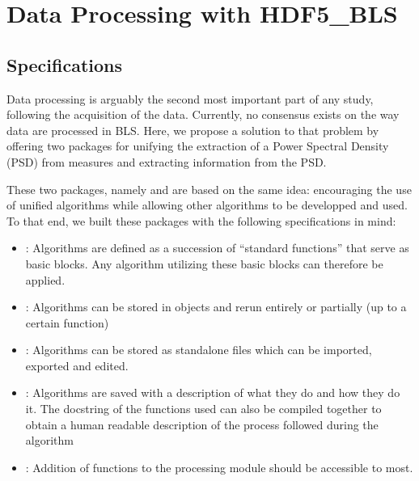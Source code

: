 \documentclass[letterpaper,10pt,english]{sphinxmanual}
\begin{document}
\sphinxstepscope


\chapter{Data Processing with HDF5\_BLS}
\label{\detokenize{source/data_processing:data-processing-with-hdf5-bls}}\label{\detokenize{source/data_processing::doc}}

\section{Specifications}
\label{\detokenize{source/data_processing:specifications}}
\sphinxAtStartPar
Data processing is arguably the second most important part of any study, following the acquisition of the data. Currently, no consensus exists on the way data are processed in BLS. Here, we propose a solution to that problem by offering two packages for unifying the extraction of a Power Spectral Density (PSD) from measures and extracting information from the PSD.

\sphinxAtStartPar
These two packages, namely  and  are based on the same idea: encouraging the use of unified algorithms while allowing other algorithms to be developped and used. To that end, we built these packages with the following specifications in mind:
\begin{itemize}
\item {} 
\sphinxAtStartPar
{}: Algorithms are defined as a succession of “standard functions” that serve as basic blocks. Any algorithm utilizing these basic blocks can therefore be applied.

\item {} 
\sphinxAtStartPar
{}: Algorithms can be stored in objects and re\sphinxhyphen{}run entirely or partially (up to a certain function)

\item {} 
\sphinxAtStartPar
{}: Algorithms can be stored as standalone files which can be imported, exported and edited.

\item {} 
\sphinxAtStartPar
{}: Algorithms are saved with a description of what they do and how they do it. The docstring of the functions used can also be compiled together to obtain a human readable description of the process followed during the algorithm

\item {} 
\sphinxAtStartPar
{}: Addition of functions to the processing module should be accessible to most.

\end{itemize}
\end{document}
